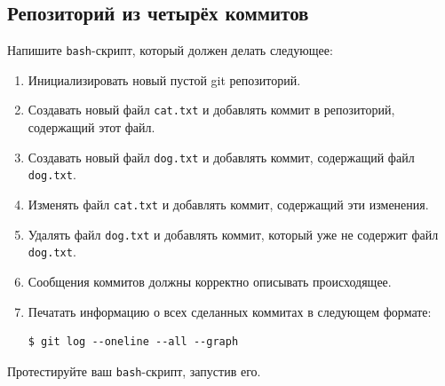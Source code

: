 \documentclass{article}
\begin{document}
\subsection{Репозиторий из четырёх коммитов}
\begin{minipage}{0.5\linewidth}
Напишите \texttt{bash}-скрипт, который должен делать следующее:
\begin{enumerate}
\item Инициализировать новый пустой git репозиторий.
\item Создавать новый файл \texttt{cat.txt} и добавлять коммит в репозиторий, содержащий этот файл.
\item Создавать новый файл \texttt{dog.txt} и добавлять коммит, содержащий файл \texttt{dog.txt}.
\item Изменять файл \texttt{cat.txt} и добавлять коммит, содержащий эти изменения.
\item Удалять файл \texttt{dog.txt} и добавлять коммит, который уже не содержит файл \texttt{dog.txt}.
\item Сообщения коммитов должны корректно описывать происходящее.
\item Печатать информацию о всех сделанных коммитах в следующем формате:
\begin{lstlisting}[style=csMiptBash]
$ git log --oneline --all --graph
\end{lstlisting}
\end{enumerate}
Протестируйте ваш \texttt{bash}-скрипт, запустив его.
\end{minipage}
\end{document}
